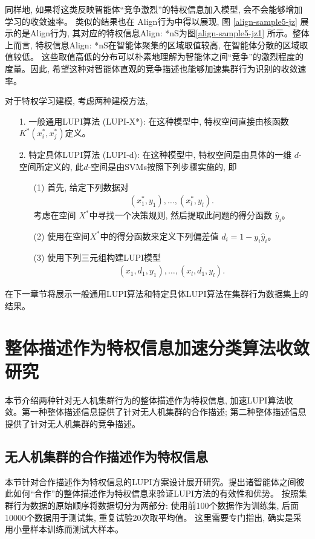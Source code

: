 同样地, 如果将这类反映智能体“竞争激烈”的特权信息加入模型, 会不会能够增加学习的收敛速率。 类似的结果也在 Align行为中得以展现, 图 \ref{align-sample5-jz} 展示的是Align行为, 其对应的特权信息{Align: *nS}为图\ref{align-sample5-jz1} 所示。整体上而言, 特权信息{Align: *nS}在智能体聚集的区域取值较高, 在智能体分散的区域取值较低。 这些取值高低的分布可以朴素地理解为智能体之间“竞争”的激烈程度的度量。因此, 希望这种对智能体直观的竞争描述也能够加速集群行为识别的收敛速率。

对于特权学习建模, 考虑两种建模方法, 
\begin{enumerate}
\item[1.] 一般通用LUPI算法 (LUPI-X*): 在这种模型中, 特权空间直接由核函数 $K^{*}(x_{i}^{*},x_{j}^{*})$定义。
\item[2.] 特定具体LUPI算法 (LUPI-d): 在这种模型中, 特权空间是由具体的一维 $d$-空间所定义的, 此$d$-空间是由SVMs按照下列步骤实施的, 即
\begin{enumerate}
\item[(1)] 首先, 给定下列数据对
\begin{align}
(x_{1}^{*}, y_{1}), \ldots, (x_{l}^{*},y_{l}).
\end{align}
考虑在空间 $X^{*}$中寻找一个决策规则, 然后提取此问题的得分函数 $\hat{y}_{i}$。
\item[(2)] 使用在空间$X^{*}$中的得分函数来定义下列偏差值 $d_{i} = 1-y_{i}\hat{y}_{i}$。
\item[(3)] 使用下列三元组构建LUPI模型
\begin{align}
(x_{1}, d_{1}, y_{1}), \ldots, (x_{l}, d_{1}, y_{l}).
\end{align}
\end{enumerate} 
\end{enumerate}

在下一章节将展示一般通用LUPI算法和特定具体LUPI算法在集群行为数据集上的结果。

\section{整体描述作为特权信息加速分类算法收敛研究}

本节介绍两种针对无人机集群行为的整体描述作为特权信息, 加速LUPI算法收敛。第一种整体描述信息提供了针对无人机集群的合作描述; 第二种整体描述信息提供了针对无人机集群的竞争描述。

\subsection{无人机集群的合作描述作为特权信息}
本节针对合作描述作为特权信息的LUPI方案设计展开研究。提出诸智能体之间彼此如何“合作”的整体描述作为特权信息来验证LUPI方法的有效性和优势。 按照集群行为数据的原始顺序将数据切分为两部分: 使用前100个数据作为训练集, 后面10000个数据用于测试集, 重复试验20次取平均值。 这里需要专门指出, 确实是采用小量样本训练而测试大样本。 


